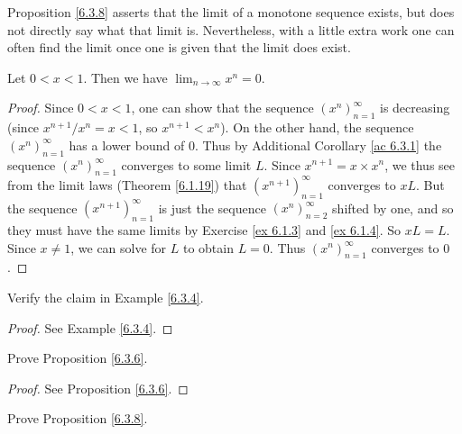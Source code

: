 \begin{note}
    Proposition \ref{6.3.8} asserts that the limit of a monotone sequence exists, but does not directly say what that limit is.
    Nevertheless, with a little extra work one can often find the limit once one is given that the limit does exist.
\end{note}

\begin{proposition}\label{6.3.10}
    Let \(0 < x < 1\).
    Then we have \(\lim_{n \to \infty} x^n = 0\).
\end{proposition}

\begin{proof}
    Since \(0 < x < 1\), one can show that the sequence \((x^n)_{n = 1}^\infty\) is decreasing
    (since \(x^{n + 1} / x^n = x < 1\), so \(x^{n + 1} < x^n\)).
    On the other hand, the sequence \((x^n)_{n = 1}^\infty\) has a lower bound of \(0\).
    Thus by Additional Corollary \ref{ac 6.3.1} the sequence \((x^n)_{n = 1}^\infty\) converges to some limit \(L\).
    Since \(x^{n + 1} = x \times x^n\), we thus see from the limit laws (Theorem \ref{6.1.19}) that \((x^{n + 1})_{n = 1}^\infty\) converges to \(xL\).
    But the sequence \((x^{n + 1})_{n = 1}^\infty\) is just the sequence \((x^n)_{n = 2}^\infty\) shifted by one, and so they must have the same limits by Exercise \ref{ex 6.1.3} and \ref{ex 6.1.4}.
    So \(xL = L\).
    Since \(x \neq 1\), we can solve for \(L\) to obtain \(L = 0\).
    Thus \((x^n)_{n = 1}^\infty\) converges to \(0\).
\end{proof}

\exercisesection

\begin{exercise}\label{ex 6.3.1}
    Verify the claim in Example \ref{6.3.4}.
\end{exercise}

\begin{proof}
    See Example \ref{6.3.4}.
\end{proof}

\begin{exercise}\label{ex 6.3.2}
    Prove Proposition \ref{6.3.6}.
\end{exercise}

\begin{proof}
    See Proposition \ref{6.3.6}.
\end{proof}

\begin{exercise}\label{ex 6.3.3}
    Prove Proposition \ref{6.3.8}.
\end{exercise}

